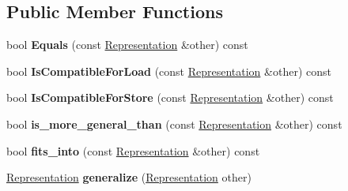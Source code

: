 \subsection*{Public Member Functions}
\begin{DoxyCompactItemize}
\item 
bool {\bfseries Equals} (const \hyperlink{classv8_1_1internal_1_1_representation}{Representation} \&other) const \hypertarget{classv8_1_1internal_1_1_representation_aef2824eae6d4f0014fcea672f6581188}{}\label{classv8_1_1internal_1_1_representation_aef2824eae6d4f0014fcea672f6581188}

\item 
bool {\bfseries Is\+Compatible\+For\+Load} (const \hyperlink{classv8_1_1internal_1_1_representation}{Representation} \&other) const \hypertarget{classv8_1_1internal_1_1_representation_a9a05513eaa5f42617b86e81ddbcf9c15}{}\label{classv8_1_1internal_1_1_representation_a9a05513eaa5f42617b86e81ddbcf9c15}

\item 
bool {\bfseries Is\+Compatible\+For\+Store} (const \hyperlink{classv8_1_1internal_1_1_representation}{Representation} \&other) const \hypertarget{classv8_1_1internal_1_1_representation_ad0e4af1f0c3ed377393e8384328edae1}{}\label{classv8_1_1internal_1_1_representation_ad0e4af1f0c3ed377393e8384328edae1}

\item 
bool {\bfseries is\+\_\+more\+\_\+general\+\_\+than} (const \hyperlink{classv8_1_1internal_1_1_representation}{Representation} \&other) const \hypertarget{classv8_1_1internal_1_1_representation_a536e4cf9ec1fa78a9dfabc3d75661a2c}{}\label{classv8_1_1internal_1_1_representation_a536e4cf9ec1fa78a9dfabc3d75661a2c}

\item 
bool {\bfseries fits\+\_\+into} (const \hyperlink{classv8_1_1internal_1_1_representation}{Representation} \&other) const \hypertarget{classv8_1_1internal_1_1_representation_a6040d81dd1341196a8ed306893a34249}{}\label{classv8_1_1internal_1_1_representation_a6040d81dd1341196a8ed306893a34249}

\item 
\hyperlink{classv8_1_1internal_1_1_representation}{Representation} {\bfseries generalize} (\hyperlink{classv8_1_1internal_1_1_representation}{Representation} other)\hypertarget{classv8_1_1internal_1_1_representation_a8bdd97567badb1040967d90910c76c54}{}\label{classv8_1_1internal_1_1_representation_a8bdd97567badb1040967d90910c76c54}


\end{DoxyCompactItemize}
